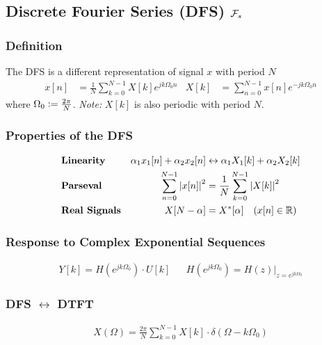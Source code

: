 \subsection{Discrete Fourier Series (DFS)  \texorpdfstring{\hfill $\mathcal{F}_s$}{}}
    \subsubsection{Definition}
        The DFS is a different representation of signal $x$ with period $N$
        \begin{align*}
            x[n] &= \frac{1}{N} \sum\limits_{k=0}^{N-1} X[k]e^{jk \Omega_0 n} & X[k] &= \sum\limits_{n=0}^{N-1} x[n]e^{-jk \Omega_0 n}
        \end{align*}
        where $\Omega_0 \vcentcolon= \frac{2\pi}{N}$. \textit{Note:} $X[k]$ is also periodic with period $N$. 

    \subsubsection{Properties of the DFS}
        \vspace{-1em}
        \begin{align*}
            &\text{\bf Linearity} & \alpha_1x_1[n] + \alpha_2x_2[n] &\leftrightarrow \alpha_1X_1[k] + \alpha_2X_2[k] \\
            &\text{\bf Parseval} & \sum\limits_{n = 0}^{N-1} \abs{x[n]}^2 &= \frac{1}{N} \sum\limits_{k=0}^{N-1} \abs{X[k]}^2\\
            &\text{\bf Real Signals} & X[N-\alpha] &= X^*[\alpha] \quad (x[n] \in \mathbb{R})
        \end{align*}

    \subsubsection{Response to Complex Exponential Sequences}
        \vspace{-1em}
        \begin{align*}
            \boxed{Y[k] = H\left(e^{jk \Omega_0}\right) \cdot U[k]} && H\left(e^{jk \Omega_0}\right) = H(z) \bigr|_{z = e^{jk \Omega_0}}
        \end{align*}

    \subsubsection{DFS \texorpdfstring{$\leftrightarrow$}{<->} DTFT}
        \vspace{-1.5em}
        \begin{align*}
            X(\Omega) = \frac{2\pi}{N}\sum\limits_{k=0}^{N-1}X[k] \cdot \delta(\Omega-k\Omega_0)
        \end{align*}
        \vspace{-1em}